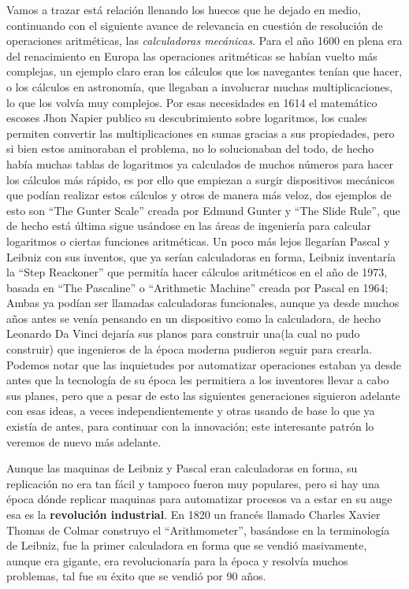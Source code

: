 \documentclass[letterpaper,12pt,oneside]{book}
\begin{document}
		Vamos a trazar está relación llenando los huecos que he dejado en medio, continuando con el siguiente avance de relevancia en cuestión de 
		resolución de operaciones aritméticas, las \textit{calculadoras mecánicas}. Para el año 1600 en plena era del renacimiento en Europa las
		operaciones aritméticas se habían vuelto más complejas, un ejemplo claro eran los cálculos que los navegantes tenían que hacer, o
		los cálculos en astronomía, que llegaban a involucrar muchas multiplicaciones, lo que los volvía muy complejos. Por esas
		necesidades en 1614 el matemático escoses Jhon Napier publico su descubrimiento sobre logaritmos, los cuales permiten
		convertir las multiplicaciones en sumas gracias a sus propiedades, pero si bien estos aminoraban el problema, no
		lo solucionaban del todo, de hecho había muchas tablas de logaritmos ya calculados de muchos números para hacer los
		cálculos más rápido, es por ello que empiezan a surgir dispositivos mecánicos que podían realizar estos cálculos y otros
		de manera más veloz, dos ejemplos de esto son ``The Gunter Scale'' creada por Edmund Gunter y ``The Slide Rule'', que de hecho
		está última sigue usándose en las áreas de ingeniería para calcular logaritmos o ciertas funciones aritméticas. Un poco
		más lejos llegarían Pascal y Leibniz con sus inventos, que ya serían calculadoras en forma, Leibniz inventaría la
		``Step Reackoner'' que permitía hacer cálculos aritméticos en el año de 1973, basada en ``The Pascaline'' o ``Arithmetic Machine'' creada
		por Pascal en 1964; Ambas ya podían ser llamadas calculadoras funcionales, aunque ya desde muchos años antes se venía pensando
		en un dispositivo como la calculadora, de hecho Leonardo Da Vinci  dejaría sus planos para construir una(la cual no pudo construir) que
		ingenieros de la época moderna pudieron seguir para crearla. Podemos notar que las inquietudes por automatizar operaciones estaban
		ya desde antes que la tecnología de su época les permitiera a los inventores llevar a cabo sus planes, pero que a pesar de esto las siguientes
		generaciones siguieron adelante con esas ideas, a veces independientemente y otras usando de base lo que ya existía de antes, para
		continuar con la innovación; este interesante patrón lo veremos de nuevo más adelante.
		
		Aunque las maquinas de Leibniz y Pascal eran calculadoras en forma, su replicación no era tan fácil y tampoco fueron muy populares, pero
		si hay una época dónde replicar maquinas para automatizar procesos va a estar en su auge esa es la \textbf{revolución industrial}. En
		1820 un francés llamado Charles Xavier Thomas de Colmar construyo el ``Arithmometer'', basándose en la terminología de Leibniz, fue la primer
		calculadora en forma que se vendió masivamente, aunque era gigante, era revolucionaría para la época y resolvía muchos problemas, tal fue
		su éxito que se vendió por 90 años.
		
\end{document}
